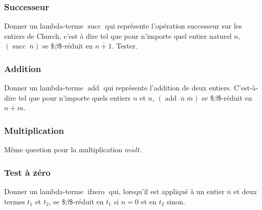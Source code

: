 \documentclass[11pt, a4paper]{article}
\begin{document}
\subsubsection{Successeur}
\label{sec:orgedd3c4e}
Donner un lambda-terme \(\operatorname{succ}\) qui représente l'opération
successeur sur les entiers de Church, c'est à dire tel que pour
n'importe quel entier naturel \(n\), \((\operatorname{succ}\; \overline{n})\) se
\$\(\beta\)\$-réduit en \(\overline{n + 1}\). Tester.

\subsubsection{Addition}
\label{sec:orgf779193}
Donner un lambda-terme \(\operatorname{add}\) qui représente l'addition de
deux entiers. C'est-à-dire tel que pour n'importe quels entiers \(n\) et
\(n\), \((\operatorname{add}\; \overline{n}\; \overline{m})\) se
\$\(\beta\)\$-réduit en \(\overline{n + m}\).

\subsubsection{Multiplication}
\label{sec:org67101b5}
Même question pour la multiplication \(\overline{mult}\).
\subsubsection{Test à zéro}
\label{sec:org9144ad7}
Donner un lambda-terme \(\operatorname{ifzero}\) qui, lorsqu'il est appliqué à un entier
\(\overline{n}\) et deux termes \(t_1\) et \(t_2\), se \$\(\beta\)\$-réduit en \(t_1\)
si \(n = 0\) et en \(t_2\) sinon.
\end{document}
